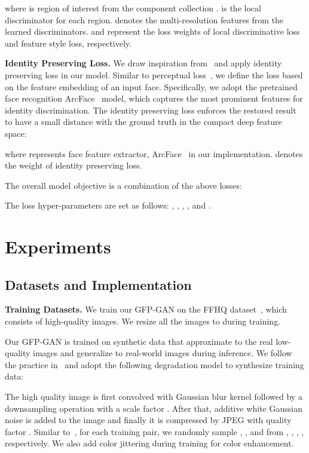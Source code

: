 \documentclass[final]{cvpr}
\begin{document}
where  is region of interest from the component collection .
 is the local discriminator for each region.  denotes the multi-resolution features from the learned discriminators.  and  represent the loss weights of local discriminative loss and feature style loss, respectively.

\noindent\textbf{Identity Preserving Loss.}
We draw inspiration from~\cite{huang2017tpgan} and apply identity preserving loss in our model.
Similar to perceptual loss~\cite{johnson2016perceptual}, we define the loss based on the feature embedding of an input face. Specifically, we adopt the pretrained  face recognition ArcFace~\cite{deng2019arcface} model, which captures the most prominent features for identity discrimination. The identity preserving loss enforces the restored result to have a small distance with the ground truth in the compact deep feature space:

where  represents face feature extractor, \ie ArcFace~\cite{deng2019arcface} in our implementation.  denotes the weight of identity preserving loss.

\medskip
The overall model objective is a combination of the above losses:

The loss hyper-parameters are set as follows: , , ,  ,  and . 
 \section{Experiments} \label{sec:experiments}

\subsection{Datasets and Implementation}
\noindent\textbf{Training Datasets.}
We train our GFP-GAN on the FFHQ dataset~\cite{karras2018stylegan}, which consists of  high-quality images. We resize all the images to  during training. 

Our GFP-GAN is trained on synthetic data that approximate to the real low-quality images and generalize to real-world images during inference. 
We follow the practice in~\cite{li2018GFRNet,li2020dfdnet} and adopt the following degradation model to synthesize training data:


The high quality image  is first convolved with Gaussian blur kernel  followed by a downsampling operation with a scale factor . After that, additive white Gaussian noise  is added to the image and finally it is compressed by JPEG with quality factor .
Similar to~\cite{li2020dfdnet}, for each training pair, we randomly sample , ,  and  from , , , , respectively. We also add color jittering during training for color enhancement.
\end{document}
